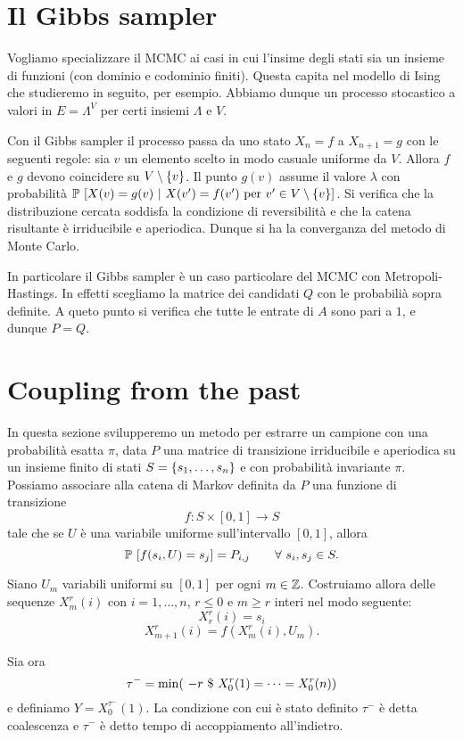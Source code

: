 \documentclass[]{marticle}
\begin{document}
\section{Il Gibbs sampler}

Vogliamo specializzare il MCMC ai casi in cui l'insime degli stati sia un
insieme di funzioni (con dominio e codominio finiti). Questa capita nel modello
di Ising che studieremo in seguito, per esempio. Abbiamo dunque un processo
stocastico a valori in $E=\Lambda^V$ per certi insiemi $\Lambda$ e $V$. 

Con il Gibbs sampler il processo passa da uno stato $X_n=f$ a $X_{n+1}=g$ con le
seguenti regole: sia $v$ un elemento scelto in modo casuale uniforme da $V$.
Allora $f$ e $g$ devono coincidere su $V\setminus\{v\}$. Il punto $g(v)$
assume il valore $\lambda$ con probabilit\`a $\prob{X(v)=g(v) \ |\ X(v')=f(v')
\text{ per } v' \in V\setminus\setof{v}}$. Si verifica che la distribuzione
cercata soddisfa la condizione di reversibilit\`a e che la catena risultante \`e
irriducibile e aperiodica. Dunque si ha la converganza del metodo di Monte
Carlo.

In particolare il Gibbs sampler \`e un caso particolare del MCMC con
Metropoli-Hastings. In effetti scegliamo la matrice dei candidati $Q$ con le
probabili\`a sopra definite. A queto punto si verifica che tutte le entrate di
$A$ sono pari a $1$, e dunque $P=Q$.

\section{Coupling from the past}

In questa sezione svilupperemo un metodo per estrarre un campione con una
probabilit\`a esatta $\pi$, data $P$ una matrice di transizione irriducibile e
aperiodica su un insieme finito di stati $S=\{s_1,\dots,s_n\}$ e con
probabilit\`a invariante $\pi$. Possiamo associare alla catena di Markov
definita da $P$ una funzione di transizione 
\[
    f\colon S\times [0,1] \longrightarrow S
\]
tale che se $U$ \`e una variabile uniforme sull'intervallo $[0,1]$, allora 
\[
    \prob{f(s_i,U)=s_j}=P_{i,j} \qquad \forall s_i,s_j \in S.
\]

Siano $U_m$ variabili uniformi su $[0,1]$ per ogni $m\in \mathbb{Z}$. Costruiamo allora
delle sequenze $X^r_m(i)$ con $i = 1,\dots,n$, $r\leq 0$ e $m \geq r$ interi nel
modo seguente:
\[
    X^r_r(i) = s_i
\]
\[
    X^r_{m+1}(i) = f(X^r_m(i), U_m).
\]

Sia ora 
\[
    \tau^-=\min(\ -r \ \$\  X^r_0(1) = \dots = X^r_0(n))
\]
e definiamo $Y = X^{\tau^-}_0(1)$. La condizione con cui \`e stato definito
$\tau^-$ \`e detta coalescenza e $\tau^-$ \`e detto tempo di accoppiamento
all'indietro.
\end{document}
